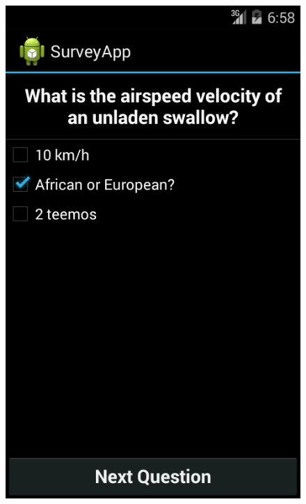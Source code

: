 \documentclass[runningheads,a4paper]{llncs}
\begin{document}
\begin{figure}[htb]
{	\includegraphics[scale=0.22]{images/android/android_3}}
	\subfigure[Question 4]{
}
\end{figure}
\end{document}
